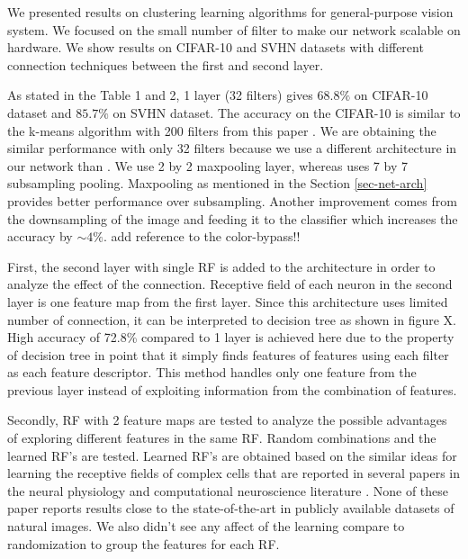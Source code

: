 \documentclass{article} %
\begin{document}



We presented results on clustering learning algorithms for general-purpose vision system. We focused on the small number of filter to make our network scalable on hardware. We show results on CIFAR-10 and SVHN datasets with different connection techniques between the first and second layer. 

As stated in the Table 1 and 2, 1 layer (32 filters) gives $68.8\%$ on CIFAR-10 dataset and  $85.7\%$ on SVHN dataset.  The accuracy on the CIFAR-10 is similar to the k-means algorithm with 200 filters from this paper
\cite{coates_analysis_2011}. We are obtaining the similar performance with only 32 filters because we use a different architecture in our network than \cite{coates_analysis_2011}. We use 2 by 2 maxpooling layer, whereas \cite{coates_analysis_2011} uses 7 by 7 subsampling pooling. Maxpooling as mentioned in the Section \ref{sec-net-arch} provides better performance over subsampling. Another improvement comes from the downsampling of the image and feeding it to the classifier which increases the accuracy by  $\sim 4\%$. add reference to the color-bypass!!

First, the second layer with single RF is added to the architecture in order to analyze the effect of the connection. Receptive field of each neuron in the second layer is one feature map from the first layer. Since this architecture uses limited number of connection, it can be interpreted to decision tree as shown in figure X. High accuracy of 72.8\% compared to 1 layer is achieved here due to the property of decision tree in point that it simply finds features of features using each filter as each feature descriptor. This method handles only one feature from the previous layer instead of exploiting information from the combination of features.

Secondly, RF with 2 feature maps are tested to analyze the possible advantages of exploring different features in the same RF. Random combinations and the learned RF's are tested. Learned RF's are obtained  based on the similar ideas for learning the receptive fields of complex cells that are reported in  several papers in the neural physiology and computational neuroscience literature  \cite{masquelier2007learning,spratling2005learning,wiskott2002slow,wallis1997invariant}. None of these paper reports results close to the state-of-the-art in publicly available datasets of natural images. We also didn't see any affect of the learning compare to randomization to group the features for each RF.
\end{document}
